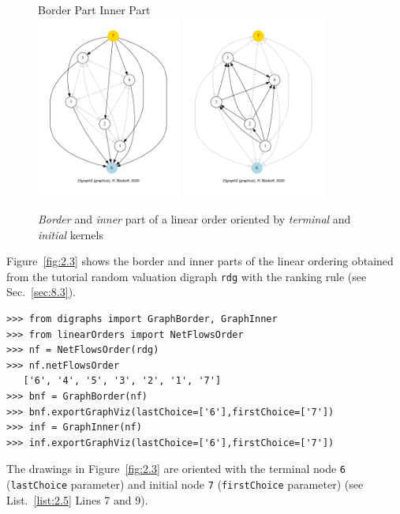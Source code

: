 \begin{figure}[ht]
  Border Part \hfill Inner Part \\
  \includegraphics[height=6cm]{Figures/2-3-linearOrderBorder.pdf}\hfill
  \includegraphics[height=6cm]{Figures/2-3-linearOrderInner.pdf}\hfill
\caption{\emph{Border} and \emph{inner} part of a linear order oriented by \emph{terminal} and \emph{initial} kernels}
\label{fig:2.3}       %
\end{figure}
Figure~\vref{fig:2.3} shows the border and inner parts of the linear ordering obtained from the tutorial random valuation digraph \texttt{rdg}  with the \NetFlows ranking rule  (see Sec.~\ref{sec:8.3}).  
\begin{lstlisting}[caption={Border and inner part of a linear order},label=list:2.5]
>>> from digraphs import GraphBorder, GraphInner
>>> from linearOrders import NetFlowsOrder
>>> nf = NetFlowsOrder(rdg)
>>> nf.netFlowsOrder
   ['6', '4', '5', '3', '2', '1', '7']
>>> bnf = GraphBorder(nf)
>>> bnf.exportGraphViz(lastChoice=['6'],firstChoice=['7'])
>>> inf = GraphInner(nf)
>>> inf.exportGraphViz(lastChoice=['6'],firstChoice=['7'])
\end{lstlisting}

The drawings in Figure~\vref{fig:2.3} are oriented with the terminal node \texttt{6} (\texttt{lastChoice} parameter) and initial node \texttt{7} (\texttt{firstChoice} parameter) (see List.~\vref{list:2.5} Lines 7 and 9).

